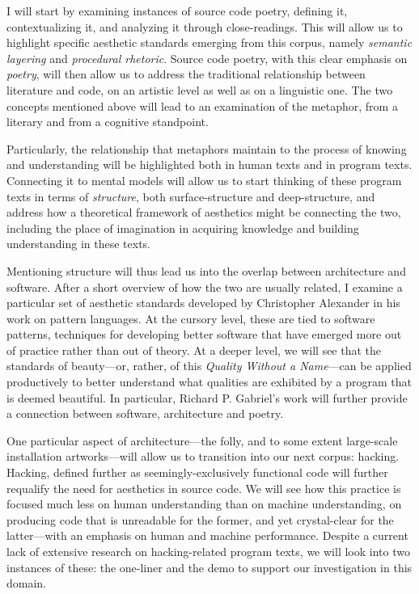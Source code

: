 \documentclass{article}
\begin{document}
I will start by examining instances of source code poetry, defining it, contextualizing it, and analyzing it through close-readings. This will allow us to highlight specific aesthetic standards emerging from this corpus, namely \emph{semantic layering} and \emph{procedural rhetoric}. Source code poetry, with this clear emphasis on \emph{poetry}, will then allow us to address the traditional relationship between literature and code, on an artistic level as well as on a linguistic one. The two concepts mentioned above will lead to an examination of the metaphor, from a literary and from a cognitive standpoint.

Particularly, the relationship that metaphors maintain to the process of knowing and understanding will be highlighted both in human texts and in program texts\cite{detienne_software_2012}. Connecting it to mental models will allow us to start thinking of these program texts in terms of \emph{structure}, both surface-structure and deep-structure, and address how a theoretical framework of aesthetics might be connecting the two, including the place of imagination in acquiring knowledge and building understanding in these texts.

Mentioning structure will thus lead us into the overlap between architecture and software. After a short overview of how the two are usually related, I examine a particular set of aesthetic standards developed by Christopher Alexander in his work on pattern languages. At the cursory level, these are tied to software patterns, techniques for developing better software that have emerged more out of practice rather than out of theory. At a deeper level, we will see that the standards of beauty—or, rather, of this \emph{Quality Without a Name}—can be applied productively to better understand what qualities are exhibited by a program that is deemed beautiful. In particular, Richard P. Gabriel's work will further provide a connection between software, architecture and poetry.

One particular aspect of architecture—the folly, and to some extent large-scale installation artworks—will allow us to transition into our next corpus: hacking. Hacking, defined further as seemingly-exclusively functional code will further requalify the need for aesthetics in source code. We will see how this practice is focused much less on human understanding than on machine understanding, on producing code that is unreadable for the former, and yet crystal-clear for the latter—with an emphasis on human and machine performance. Despite a current lack of extensive research on hacking-related program texts, we will look into two instances of these: the one-liner and the demo to support our investigation in this domain.
\end{document}
